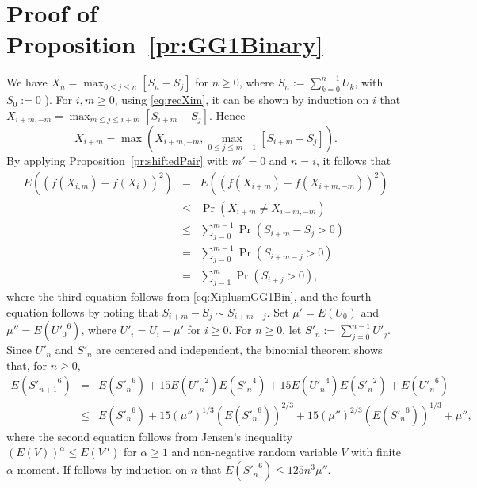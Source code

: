 \documentclass[a4paper,11pt]{article}
\begin{document}
\section{Proof of Proposition~\ref{pr:GG1Binary}}
We have \(X_{n}=\max_{0\leq j\leq n}[S_{n}-S_{j}]\) for  \(n\geq0\),   where  \(S_{n}:=\sum^{n-1}_{k=0}U_{k}\), with \(S_{0}:=0\)   \citep[\S I, Eq.~(1.4)]{asmussenGlynn2007}). For \(i,m\ge0\), using \eqref{eq:recXim}, it can be shown by induction  on \(i\) that \(X_{i+m,-m}=\max_{m\leq j\leq i+m}[S_{i+m}-S_{j}]\).  Hence \begin{equation}\label{eq:XiplusmGG1Bin}
X_{i+m}=\max(X_{i+m,-m},\max_{0\leq j\leq m-1}[S_{i+m}-S_{j}]).
\end{equation} By applying Proposition~\ref{pr:shiftedPair} with \(m'=0\) and \(n=i\),  it follows that \begin{eqnarray*}E((f(X_{i,m})-f(X_{i}))^{2})&=&
E((f(X_{i+m})-f(X_{i+m,-m}))^{2})\\&\leq&\Pr (X_{i+m}\neq X_{i+m,-m})\\
&\leq&  \sum^{m-1}_{j=0}\Pr (S_{i+m}-S_{j}>0)
\\&=&\sum^{m-1}_{j=0}\Pr (S_{i+m-j}>0)
\\&=&\sum^{m}_{j=1}\Pr (S_{i+j}>0),
\end{eqnarray*}
where the third equation follows from \eqref{eq:XiplusmGG1Bin}, and  the fourth equation follows by noting that  \(S_{i+m}-S_{j}\sim S_{i+m-j}\). Set \(\mu'=E(U_{0})\) and \(\mu ''=E({U'_{0}}^{6})\), where \(U'_{i}=U_{i}-\mu'\) for \(i\geq0\). For \(n\geq0\), let   \(S'_{n}:=\sum^{n-1}_{j=0}U'_{j}\). Since \(U'_{n}\) and \(S'_{n}\) are centered and independent,  the binomial theorem shows that, for \(n\geq0\),\begin{eqnarray*}E({S'_{n+1}}^{6})
&=&E({S'_{n}}^{6})+15E({U'_{n}}^{2})E({S'_{n}}^{4})+15E({U'_{n}}^{4})E({S'_{n}}^{2})+E({U'_{n}}^{6})\\
&\le&E({S'_{n}}^{6})+15(\mu '')^{1/3}(E({S'_{n}}^{6}))^{2/3}+15(\mu '')^{2/3}(E({S'_{n}}^{6}))^{1/3}+\mu '',
\end{eqnarray*} where the second equation follows from Jensen's inequality \((E(V))^{\alpha}\leq E(V^{\alpha})\) for \(\alpha\geq1\) and non-negative random variable \(V\) with finite \(\alpha\)-moment. If follows by induction on \(n\) that \(E({S'_{n}}^{6})\leq125n^{3}\mu''\).
\end{document}
